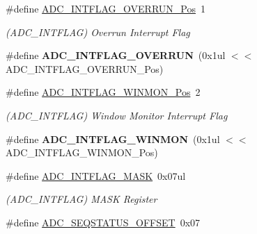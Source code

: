 \begin{DoxyCompactItemize}
\item 
\hypertarget{group___s_a_m_l21___a_d_c_gae42501968146288809110683854b38d5}{}\#define \hyperlink{group___s_a_m_l21___a_d_c_gae42501968146288809110683854b38d5}{A\+D\+C\+\_\+\+I\+N\+T\+F\+L\+A\+G\+\_\+\+O\+V\+E\+R\+R\+U\+N\+\_\+\+Pos}~1\label{group___s_a_m_l21___a_d_c_gae42501968146288809110683854b38d5}

\begin{DoxyCompactList}\small\item\em (A\+D\+C\+\_\+\+I\+N\+T\+F\+L\+A\+G) Overrun Interrupt Flag \end{DoxyCompactList}\item 
\hypertarget{group___s_a_m_l21___a_d_c_gac87b52c32998b04f2cb3f202abb818b4}{}\#define {\bfseries A\+D\+C\+\_\+\+I\+N\+T\+F\+L\+A\+G\+\_\+\+O\+V\+E\+R\+R\+U\+N}~(0x1ul $<$$<$ A\+D\+C\+\_\+\+I\+N\+T\+F\+L\+A\+G\+\_\+\+O\+V\+E\+R\+R\+U\+N\+\_\+\+Pos)\label{group___s_a_m_l21___a_d_c_gac87b52c32998b04f2cb3f202abb818b4}

\item 
\hypertarget{group___s_a_m_l21___a_d_c_gad83aca0d61282d0c0ac67d10028729d0}{}\#define \hyperlink{group___s_a_m_l21___a_d_c_gad83aca0d61282d0c0ac67d10028729d0}{A\+D\+C\+\_\+\+I\+N\+T\+F\+L\+A\+G\+\_\+\+W\+I\+N\+M\+O\+N\+\_\+\+Pos}~2\label{group___s_a_m_l21___a_d_c_gad83aca0d61282d0c0ac67d10028729d0}

\begin{DoxyCompactList}\small\item\em (A\+D\+C\+\_\+\+I\+N\+T\+F\+L\+A\+G) Window Monitor Interrupt Flag \end{DoxyCompactList}\item 
\hypertarget{group___s_a_m_l21___a_d_c_ga02cd4cf333a8a4d2e1c81fd4771896cf}{}\#define {\bfseries A\+D\+C\+\_\+\+I\+N\+T\+F\+L\+A\+G\+\_\+\+W\+I\+N\+M\+O\+N}~(0x1ul $<$$<$ A\+D\+C\+\_\+\+I\+N\+T\+F\+L\+A\+G\+\_\+\+W\+I\+N\+M\+O\+N\+\_\+\+Pos)\label{group___s_a_m_l21___a_d_c_ga02cd4cf333a8a4d2e1c81fd4771896cf}

\item 
\hypertarget{group___s_a_m_l21___a_d_c_gad6ae9e9e9b6b800afe5a4d69bb9fac91}{}\#define \hyperlink{group___s_a_m_l21___a_d_c_gad6ae9e9e9b6b800afe5a4d69bb9fac91}{A\+D\+C\+\_\+\+I\+N\+T\+F\+L\+A\+G\+\_\+\+M\+A\+S\+K}~0x07ul\label{group___s_a_m_l21___a_d_c_gad6ae9e9e9b6b800afe5a4d69bb9fac91}

\begin{DoxyCompactList}\small\item\em (A\+D\+C\+\_\+\+I\+N\+T\+F\+L\+A\+G) M\+A\+S\+K Register \end{DoxyCompactList}\item 
\hypertarget{group___s_a_m_l21___a_d_c_ga7f77f73e1619136c3dbc2ab2e59e47c2}{}\#define \hyperlink{group___s_a_m_l21___a_d_c_ga7f77f73e1619136c3dbc2ab2e59e47c2}{A\+D\+C\+\_\+\+S\+E\+Q\+S\+T\+A\+T\+U\+S\+\_\+\+O\+F\+F\+S\+E\+T}~0x07\label{group___s_a_m_l21___a_d_c_ga7f77f73e1619136c3dbc2ab2e59e47c2}


\end{DoxyCompactItemize}

